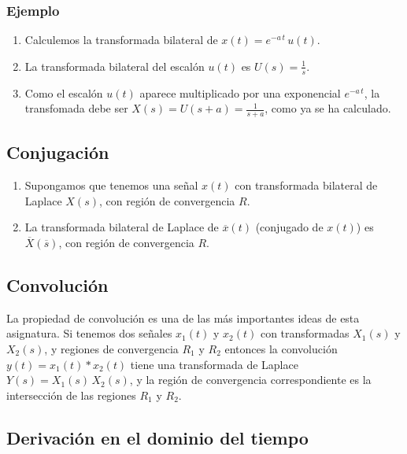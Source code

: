 \subsubsection{Ejemplo}

\begin{enumerate}
\item Calculemos la transformada bilateral de $x(t) = e^{-a \, t} \, u(t)$.

\item La transformada bilateral del escal\'{o}n $u(t)$ es $U(s) = \frac{1}{s}$.

\item Como el escal\'{o}n $u(t)$ aparece multiplicado por una exponencial $e^{-a \, t}$, la transfomada debe ser
$X(s) = U(s + a) = \frac{1}{s + a}$, como ya se ha calculado. 
\end{enumerate}


\subsection{Conjugaci\'{o}n}

\begin{enumerate}
\item Supongamos que tenemos una se\~{n}al $x(t)$ con transformada bilateral de Laplace $X(s)$, con regi\'{o}n de convergencia $R$.

\item La transformada bilateral de Laplace de $\overline{x}(t)$ (conjugado de $x(t)$) es $\overline{X}(\overline{s})$, 
con regi\'{o}n de convergencia $R$.
\end{enumerate}

\subsection{Convoluci\'{o}n}

La propiedad de convoluci\'{o}n es una de las más importantes ideas de esta asignatura.
Si tenemos dos señales $x_{1}(t)$ y $x_{2}(t)$ con transformadas $X_{1}(s)$ y $X_{2}(s)$, y regiones
de convergencia $R_{1}$ y $R_{2}$ entonces
la convolución $y(t) = x_{1}(t) * x_{2}(t)$ tiene una transformada de Laplace 
$Y(s) = X_{1}(s) \, X_{2}(s)$, y la región de convergencia correspondiente es la intersección de las 
regiones $R_{1}$ y $R_{2}$.

\subsection{Derivaci\'{o}n en el dominio del tiempo}

